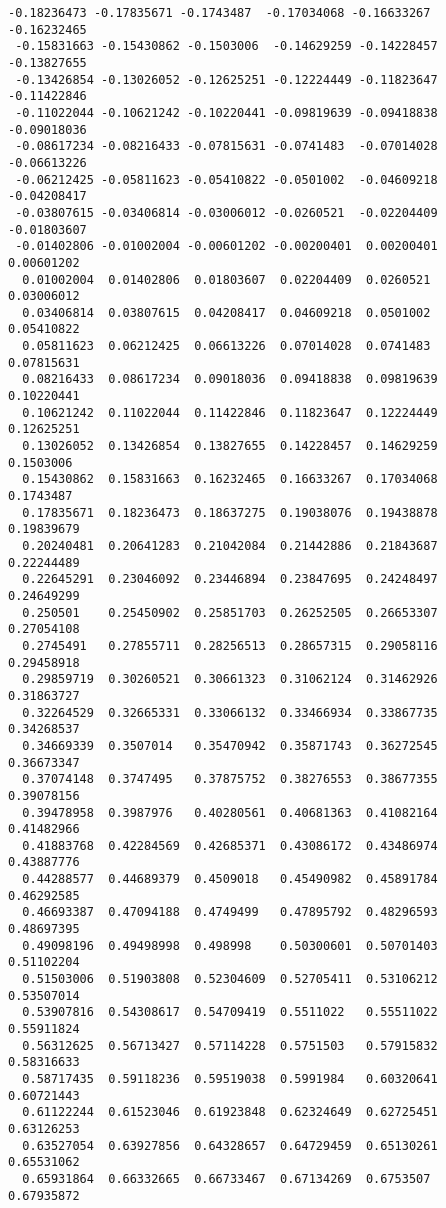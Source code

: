 \documentclass[11pt]{article}
\begin{document}
\begin{Verbatim}[commandchars=\\\{\}]
 -0.18236473 -0.17835671 -0.1743487  -0.17034068 -0.16633267 -0.16232465
 -0.15831663 -0.15430862 -0.1503006  -0.14629259 -0.14228457 -0.13827655
 -0.13426854 -0.13026052 -0.12625251 -0.12224449 -0.11823647 -0.11422846
 -0.11022044 -0.10621242 -0.10220441 -0.09819639 -0.09418838 -0.09018036
 -0.08617234 -0.08216433 -0.07815631 -0.0741483  -0.07014028 -0.06613226
 -0.06212425 -0.05811623 -0.05410822 -0.0501002  -0.04609218 -0.04208417
 -0.03807615 -0.03406814 -0.03006012 -0.0260521  -0.02204409 -0.01803607
 -0.01402806 -0.01002004 -0.00601202 -0.00200401  0.00200401  0.00601202
  0.01002004  0.01402806  0.01803607  0.02204409  0.0260521   0.03006012
  0.03406814  0.03807615  0.04208417  0.04609218  0.0501002   0.05410822
  0.05811623  0.06212425  0.06613226  0.07014028  0.0741483   0.07815631
  0.08216433  0.08617234  0.09018036  0.09418838  0.09819639  0.10220441
  0.10621242  0.11022044  0.11422846  0.11823647  0.12224449  0.12625251
  0.13026052  0.13426854  0.13827655  0.14228457  0.14629259  0.1503006
  0.15430862  0.15831663  0.16232465  0.16633267  0.17034068  0.1743487
  0.17835671  0.18236473  0.18637275  0.19038076  0.19438878  0.19839679
  0.20240481  0.20641283  0.21042084  0.21442886  0.21843687  0.22244489
  0.22645291  0.23046092  0.23446894  0.23847695  0.24248497  0.24649299
  0.250501    0.25450902  0.25851703  0.26252505  0.26653307  0.27054108
  0.2745491   0.27855711  0.28256513  0.28657315  0.29058116  0.29458918
  0.29859719  0.30260521  0.30661323  0.31062124  0.31462926  0.31863727
  0.32264529  0.32665331  0.33066132  0.33466934  0.33867735  0.34268537
  0.34669339  0.3507014   0.35470942  0.35871743  0.36272545  0.36673347
  0.37074148  0.3747495   0.37875752  0.38276553  0.38677355  0.39078156
  0.39478958  0.3987976   0.40280561  0.40681363  0.41082164  0.41482966
  0.41883768  0.42284569  0.42685371  0.43086172  0.43486974  0.43887776
  0.44288577  0.44689379  0.4509018   0.45490982  0.45891784  0.46292585
  0.46693387  0.47094188  0.4749499   0.47895792  0.48296593  0.48697395
  0.49098196  0.49498998  0.498998    0.50300601  0.50701403  0.51102204
  0.51503006  0.51903808  0.52304609  0.52705411  0.53106212  0.53507014
  0.53907816  0.54308617  0.54709419  0.5511022   0.55511022  0.55911824
  0.56312625  0.56713427  0.57114228  0.5751503   0.57915832  0.58316633
  0.58717435  0.59118236  0.59519038  0.5991984   0.60320641  0.60721443
  0.61122244  0.61523046  0.61923848  0.62324649  0.62725451  0.63126253
  0.63527054  0.63927856  0.64328657  0.64729459  0.65130261  0.65531062
  0.65931864  0.66332665  0.66733467  0.67134269  0.6753507   0.67935872

\end{Verbatim}
\end{document}
